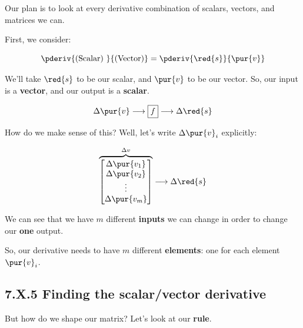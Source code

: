         Our plan is to look at every derivative combination of scalars, vectors, and matrices we can.
        
        First, we consider:
        
        \begin{equation}
            \pderiv{ \text{(Scalar) } } { \text{(Vector)} }
            =
            \pderiv{\red{s}}{ \pur{v} } 
        \end{equation}
        
        We'll take $\red{s}$ to be our scalar, and $\pur{v}$ to be our vector. So, our input is a \textbf{vector}, and our output is a \textbf{scalar}.
        
        \begin{equation}
            \Delta \pur{v}
            \longrightarrow
            \boxed{f}
            \longrightarrow
            \Delta \red{s}
        \end{equation}
        
        How do we make sense of this? Well, let's write $\Delta \pur{v}_i$ explicitly:
        
        \begin{equation}
            \overbrace{
                \begin{bmatrix}
                    \Delta \pur{v_1}\\ \Delta \pur{v_2}\\ \vdots \\ \Delta \pur{v_m}
                \end{bmatrix}
            }^{\Delta v}
            \longrightarrow 
            \Delta \red{s}
        \end{equation}
        
        We can see that we have $m$ different \textbf{inputs} we can change in order to change our \textbf{one} output.
        
        So, our derivative needs to have $m$ different \textbf{elements}: one for each element $\pur{v}_i$.
    
    \secdiv
       
    \subsection*{7.X.5 \quad Finding the scalar/vector derivative}
        
        But how do we shape our matrix? Let's look at our \textbf{rule}.
        
